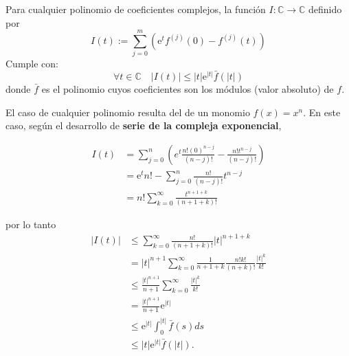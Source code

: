\begin{cajita}
    \begin{lema}
        Para cualquier polinomio de coeficientes complejos, la función $I: \mathbb{C} \rightarrow \mathbb{C}$ definido por
$$
I(t):=\sum_{j=0}^{m}\left(\mathrm{e}^t f^{(j)}(0)-f^{(j)}(t)\right)
$$
Cumple con:
$$
\forall t \in \mathbb{C} \quad|I(t)| \leq|t| \mathrm{e}^{|t|} \bar{f}(|t|)
$$
donde $\bar{f}$ es el polinomio cuyos coeficientes son los módulos (valor absoluto) de $f$.

\begin{dem}
    El caso de cualquier polinomio resulta del de un monomio $f(x)=x^n$.
En este caso, según el desarrollo de \textbf{serie de la compleja exponencial},

\begin{align*}
    I(t)&=\sum_{j=0}^n \left(e^t\frac{n!(0)^{n-j}}{(n-j)!}-\frac{n!t^{n-j}}{(n-j)!}\right)\\
    &=\mathrm{e}^t n !-\sum_{j=0}^n \frac{n !}{(n-j) !} t^{n-j}\\
    &=n ! \sum_{k=0}^{\infty} \frac{t^{n+1+k}}{(n+1+k) !}
\end{align*}

por lo tanto
$$
\begin{aligned}
|I(t)| & \leq \sum_{k=0}^{\infty} \frac{n !}{(n+1+k) !}|t|^{n+1+k} \\
&=|t|^{n+1} \sum_{k=0}^{\infty} \frac{1}{n+1+k} \frac{n ! k !}{(n+k) !} \frac{|t|^k}{k !} \\
& \leq \frac{|t|^{n+1}}{n+1} \sum_{k=0}^{\infty} \frac{|t|^k}{k !} \\
&=\frac{|t|^{n+1}}{n+1} \mathrm{e}^{|t|} \\
&\leq \mathrm{e}^{|t|} \int_0^{|t|} \bar{f}(s) ds\\
& \leq|t| \mathrm{e}^{|t|} \bar{f}(|t|) .
\end{aligned}
$$
   \end{dem}
    \end{lema}
    
\end{cajita}

